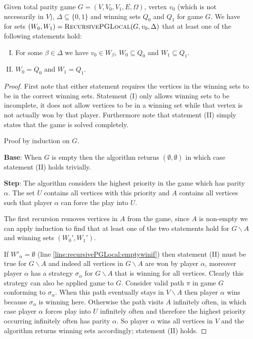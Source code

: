 \begin{theorem}
	Given total parity game $G = (V,V_0,V_1,E,\Omega)$, vertex $v_0$ (which is not necessarily in $V$), $\Delta \subseteq \{0,1\}$ and winning sets $Q_0$ and $Q_1$ for game $G$. We have for sets $(W_0,W_1) = \textsc{RecursivePGLocal}(G,v_0,\Delta)$ that at least one of the following statements hold:
	\begin{enumerate}[(I)]
		\item For some $\beta \in \Delta$ we have $v_0 \in W_\beta$, $W_0 \subseteq Q_0$ and $W_1 \subseteq Q_1$.
		\item $W_0 = Q_0$ and $W_1 = Q_1$.
	\end{enumerate}
		\begin{proof}
			First note that either statement requires the vertices in the winning sets to be in the correct winning sets. Statement (I) only allows winning sets to be incomplete, it does not allow vertices to be in a winning set while that vertex is not actually won by that player. Furthermore note that statement (II) simply states that the game is solved completely.
			
			Proof by induction on $G$. 
			
			\textbf{Base}: When $G$ is empty then the algorithm returns $(\emptyset, \emptyset)$ in which case statement (II) holds trivially.
			
			\textbf{Step}: The algorithm considers the highest priority in the game which has parity $\alpha$. The set $U$ contains all vertices with this priority and $A$ contains all vertices such that player $\alpha$ can force the play into $U$.
			
			The first recursion removes vertices in $A$ from the game, since $A$ is non-empty we can apply induction to find that at least one of the two statements hold for $G\backslash A$ and winning sets $(W_0',W_1')$.
			
			If $W'_{\overline{\alpha}} = \emptyset$ (line \ref{line:recursivePGLocal:emptywinif}) then statement (II) must be true for $G \backslash A$ and indeed all vertices in $G\backslash A$ are won by player $\alpha$, moreover player $\alpha$ has a strategy $\sigma_\alpha$ for $G\backslash A$ that is winning for all vertices. Clearly this strategy can also be applied game to $G$. Consider valid path $\pi$ in game $G$ conforming to $\sigma_\alpha$. When this path eventually stays in $V \backslash A$ then player $\alpha$ wins because $\sigma_\alpha$ is winning here. Otherwise the path visits $A$ infinitely often, in which case player $\alpha$ forces play into $U$ infinitely often and therefore the highest priority occurring infinitely often has parity $\alpha$. So player $\alpha$ wins all vertices in $V$ and the algorithm returns winning sets accordingly; statement (II) holds.
			

\end{proof}
\end{theorem}
